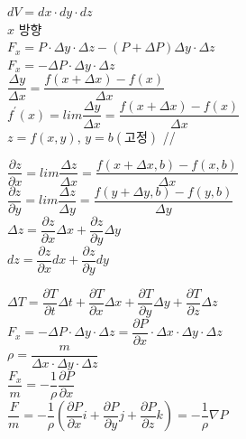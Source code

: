 \documentclass[11pt]{beamer}
\begin{document}
\begin{frame}{1.5}\footnotesize

$ dV = dx \cdot dy \cdot dz $\\
$x$ 방향 \\
$ F_{x} = P \cdot \Delta y \cdot \Delta z - \left( P + \Delta P \right) \Delta y \cdot \Delta z$\\
$ F_{x} = - \Delta P \cdot \Delta y \cdot \Delta z $\\

$ \dfrac { \Delta y}{\Delta x } = \dfrac {f\left(x + \Delta x \right) - f\left(x \right)}{ \Delta x}$\\

$f^{\prime} \left(x \right) = lim \dfrac { \Delta y}{\Delta x } = \dfrac {f\left(x + \Delta x \right) - f\left(x \right)}{ \Delta x}$\\

$z = f \left( x, y \right) $, $ y = b \left( 고정 \right) $ //

$\dfrac{\partial z}{\partial x} = lim \dfrac { \Delta z}{\Delta x } = \dfrac {f\left(x + \Delta x, b \right) - f\left(x, b \right)}{ \Delta x}$\\

$\dfrac{\partial z}{\partial y} = lim \dfrac { \Delta z}{\Delta y } = \dfrac {f\left(y + \Delta y, b \right) - f\left(y, b \right)}{ \Delta y}$\\

$ \Delta z = \dfrac{\partial z}{\partial x} \Delta x + \dfrac{\partial z}{\partial y} \Delta y $\\
$ dz = \dfrac{\partial z}{\partial x} dx + \dfrac{\partial z}{\partial y} dy $\\
 \end{frame}

\begin{frame}{1.5}\footnotesize

$ \Delta T = \dfrac{\partial T}{\partial t} \Delta t + \dfrac{\partial T}{\partial x} \Delta x + \dfrac{\partial T}{\partial y} \Delta y + \dfrac{\partial T}{\partial z} \Delta z $\\
$ F_{x} = - \Delta P \cdot \Delta y \cdot \Delta z = \dfrac{\partial P}{\partial x} \cdot \Delta x \cdot \Delta y \cdot \Delta z $\\
$ \rho = \dfrac {m}{\Delta x \cdot \Delta y \cdot \Delta z} $ \\

$ \dfrac {F_{x}}{m} = - \dfrac{1}{\rho} \dfrac{\partial P}{\partial x} $ \\

$ \dfrac {F}{m} = - \dfrac{1}{\rho} \left( \dfrac{\partial P}{\partial x} i + \dfrac{\partial P}{\partial y} j + \dfrac{\partial P}{\partial z} k \right) = - \dfrac{1}{\rho} \nabla P$ \\


\end{frame}
\end{document}
